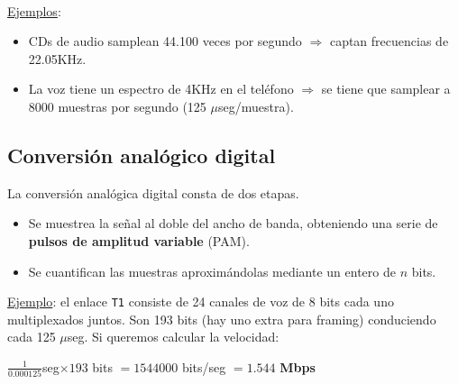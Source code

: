 \documentclass[]{article}
\begin{document}
~\newline
{}

\underline{Ejemplos}:
\begin{itemize}
    \item CDs de audio samplean 44.100 veces por segundo $\Rightarrow$ captan frecuencias de 22.05KHz.
    \item La voz tiene un espectro de 4KHz en el teléfono $\Rightarrow$ se tiene que samplear a 8000 muestras por segundo (125 $\mu$seg/muestra).
\end{itemize}

\subsection{Conversión analógico digital}



La conversión analógica digital consta de dos etapas.
\begin{itemize}
    \item Se muestrea la señal al doble del ancho de banda, obteniendo una serie de \textbf{pulsos de amplitud variable} (PAM).
    \item Se cuantifican las muestras aproximándolas mediante un entero de $n$ bits.
\end{itemize}

\underline{Ejemplo}: el enlace \texttt{T1} consiste de 24 canales de voz de 8 bits cada uno multiplexados juntos. Son 193 bits (hay uno extra para framing) conduciendo cada 125 $\mu$seg. Si queremos calcular la velocidad:
\begin{center}
    $\frac{1}{0.000125}$seg$ \times 193$ bits $= 1544000$ bits/seg $=1.544$ \textbf{Mbps}
\end{center}
\end{document}

